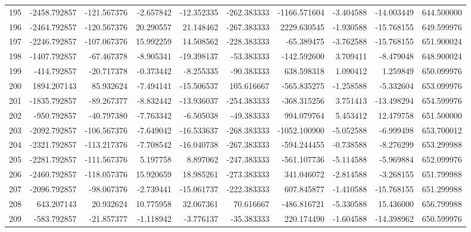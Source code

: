 \begin{tabular}{lrrrrrrrrr}
195 &  -2458.792857 &  -121.567376 &  -2.657842 & -12.352335 &  -262.383333 & -1166.571604 &  -3.404588 & -14.003449 &  644.500000 \\
196 &  -2464.792857 &  -120.567376 &  20.290557 &  21.148462 &  -267.383333 &  2229.630545 &  -1.930588 & -15.768155 &  649.599976 \\
197 &  -2246.792857 &  -107.067376 &  15.992259 &  14.508562 &  -228.383333 &   -65.389475 &  -3.762588 & -15.768155 &  651.900024 \\
198 &  -1407.792857 &   -67.467378 &  -8.905341 & -19.398137 &   -53.383333 &  -142.592600 &   3.709411 &  -8.479048 &  648.900024 \\
199 &   -414.792857 &   -20.717378 &  -0.373442 &  -8.255335 &   -90.383333 &   638.598318 &   1.090412 &   1.259849 &  650.099976 \\
200 &   1894.207143 &    85.932624 &  -7.494141 & -15.506537 &   105.616667 &  -565.835275 &  -1.258588 &  -5.332604 &  653.099976 \\
201 &  -1835.792857 &   -89.267377 &  -8.832442 & -13.936037 &  -254.383333 &  -368.315256 &   3.751413 & -13.498294 &  654.599976 \\
202 &   -950.792857 &   -40.797380 &  -7.763342 &  -6.505038 &   -49.383333 &   994.079764 &   5.453412 &  12.479758 &  651.500000 \\
203 &  -2092.792857 &  -106.567376 &  -7.649042 & -16.533637 &  -268.383333 & -1052.100900 &  -5.052588 &  -6.999498 &  653.700012 \\
204 &  -2321.792857 &  -113.217376 &  -7.708542 & -16.040738 &  -267.383333 &  -594.244455 &  -0.738588 &  -8.276299 &  653.299988 \\
205 &  -2281.792857 &  -111.567376 &   5.197758 &   8.897062 &  -247.383333 &  -561.107736 &  -5.114588 &  -5.969884 &  652.099976 \\
206 &  -2460.792857 &  -118.057376 &  15.920659 &  18.985261 &  -273.383333 &   341.046072 &  -2.814588 &  -3.268155 &  651.799988 \\
207 &  -2096.792857 &   -98.067376 &  -2.739441 & -15.061737 &  -222.383333 &   607.845877 &  -1.410588 & -15.768155 &  651.299988 \\
208 &    643.207143 &    20.932624 &  10.775958 &  32.067361 &    70.616667 &  -486.816721 &  -5.330588 &  15.436000 &  656.799988 \\
209 &   -583.792857 &   -21.857377 &  -1.118942 &  -3.776137 &   -35.383333 &   220.174490 &  -1.604588 & -14.398962 &  650.599976 \\

\end{tabular}
